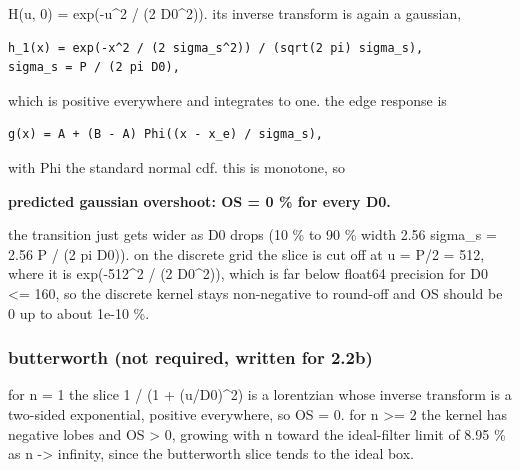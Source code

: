 H(u, 0) = exp(-u\textasciicircum{}2 / (2 D0\textasciicircum{}2)). its inverse transform is again a gaussian,

\begin{verbatim}
h_1(x) = exp(-x^2 / (2 sigma_s^2)) / (sqrt(2 pi) sigma_s),
sigma_s = P / (2 pi D0),
\end{verbatim}

which is positive everywhere and integrates to one. the edge response is

\begin{verbatim}
g(x) = A + (B - A) Phi((x - x_e) / sigma_s),
\end{verbatim}

with Phi the standard normal cdf. this is monotone, so

\textbf{predicted gaussian overshoot: OS = 0 \% for every D0.}

the transition just gets wider as D0 drops (10 \% to 90 \% width 2.56 sigma\_s = 2.56 P / (2 pi D0)). on the discrete grid the slice is cut off at \textbar{}u\textbar{} = P/2 = 512, where it is exp(-512\textasciicircum{}2 / (2 D0\textasciicircum{}2)), which is far below float64 precision for D0 \textless{}= 160, so the discrete kernel stays non-negative to round-off and OS should be 0 up to about 1e-10 \%.

\subsubsection*{butterworth (not required, written for 2.2b)}

for n = 1 the slice 1 / (1 + (u/D0)\textasciicircum{}2) is a lorentzian whose inverse transform is a two-sided exponential, positive everywhere, so OS = 0. for n \textgreater{}= 2 the kernel has negative lobes and OS \textgreater{} 0, growing with n toward the ideal-filter limit of 8.95 \% as n -\textgreater{} infinity, since the butterworth slice tends to the ideal box.
